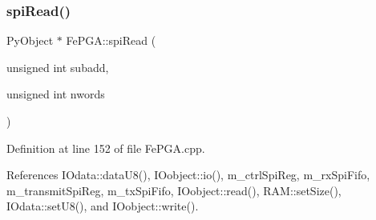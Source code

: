 \subsubsection{\texorpdfstring{spi\+Read()}{spiRead()}\hspace{0.1cm}{\footnotesize\ttfamily [2/3]}}
{\footnotesize\ttfamily Py\+Object $\ast$ Fe\+P\+G\+A\+::spi\+Read (\begin{DoxyParamCaption}\item[{unsigned int}]{subadd,  }\item[{unsigned int}]{nwords }\end{DoxyParamCaption})}



Definition at line 152 of file Fe\+P\+G\+A.\+cpp.



References I\+Odata\+::data\+U8(), I\+Oobject\+::io(), m\+\_\+ctrl\+Spi\+Reg, m\+\_\+rx\+Spi\+Fifo, m\+\_\+transmit\+Spi\+Reg, m\+\_\+tx\+Spi\+Fifo, I\+Oobject\+::read(), R\+A\+M\+::set\+Size(), I\+Odata\+::set\+U8(), and I\+Oobject\+::write().


